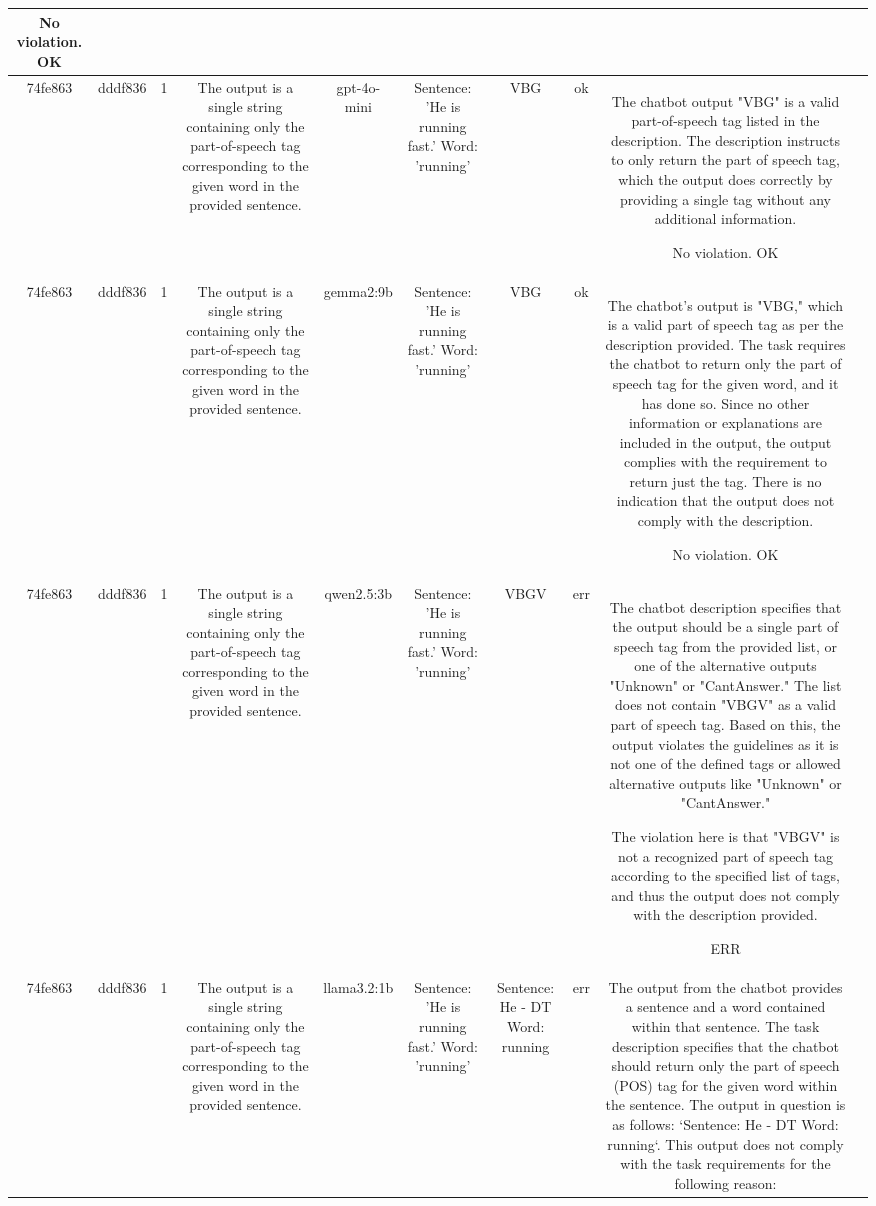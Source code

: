 \begin{table}[h!]
\begin{tabular}{|c|c|c|c|c|c|c|c|c|c|}
No violation.
OK & \\
\hline
74fe863 & dddf836 & 1 & The output is a single string containing only the part-of-speech tag corresponding to the given word in the provided sentence. & gpt-4o-mini & Sentence: 'He is running fast.' Word: 'running' & VBG & ok & The chatbot output "VBG" is a valid part-of-speech tag listed in the description. The description instructs to only return the part of speech tag, which the output does correctly by providing a single tag without any additional information. 

No violation.
OK & \\
\hline
74fe863 & dddf836 & 1 & The output is a single string containing only the part-of-speech tag corresponding to the given word in the provided sentence. & gemma2:9b & Sentence: 'He is running fast.' Word: 'running' & VBG 
 & ok & The chatbot's output is "VBG," which is a valid part of speech tag as per the description provided. The task requires the chatbot to return only the part of speech tag for the given word, and it has done so. Since no other information or explanations are included in the output, the output complies with the requirement to return just the tag. There is no indication that the output does not comply with the description.

No violation.
OK & \\
\hline
74fe863 & dddf836 & 1 & The output is a single string containing only the part-of-speech tag corresponding to the given word in the provided sentence. & qwen2.5:3b & Sentence: 'He is running fast.' Word: 'running' & VBGV & err & The chatbot description specifies that the output should be a single part of speech tag from the provided list, or one of the alternative outputs "Unknown" or "CantAnswer." The list does not contain "VBGV" as a valid part of speech tag. Based on this, the output violates the guidelines as it is not one of the defined tags or allowed alternative outputs like "Unknown" or "CantAnswer."

The violation here is that "VBGV" is not a recognized part of speech tag according to the specified list of tags, and thus the output does not comply with the description provided. 

ERR & \\
\hline
74fe863 & dddf836 & 1 & The output is a single string containing only the part-of-speech tag corresponding to the given word in the provided sentence. & llama3.2:1b & Sentence: 'He is running fast.' Word: 'running' &  Sentence: He - DT
Word:  running & err & The output from the chatbot provides a sentence and a word contained within that sentence. The task description specifies that the chatbot should return only the part of speech (POS) tag for the given word within the sentence. The output in question is as follows: `Sentence: He - DT Word: running`. This output does not comply with the task requirements for the following reason:


\end{tabular}
\end{table}
